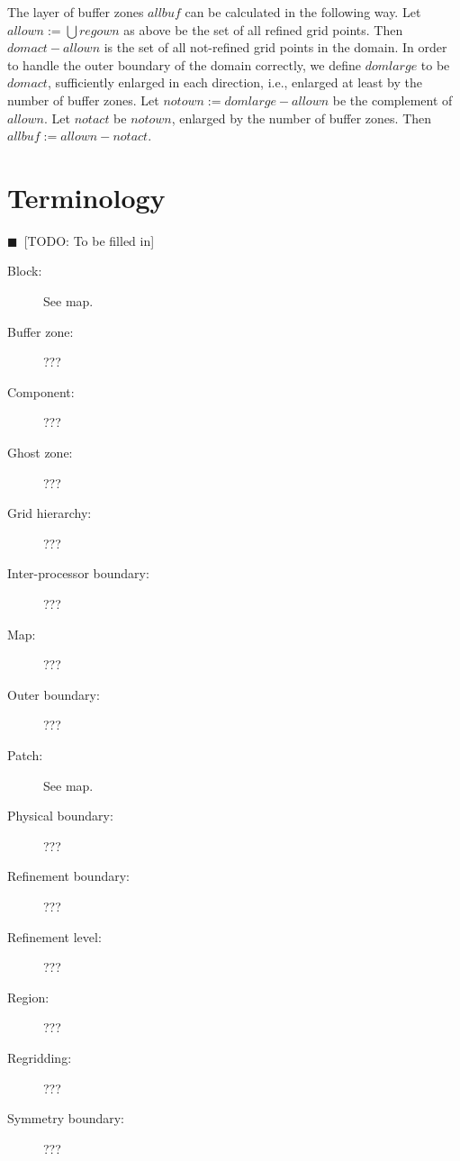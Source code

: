 \documentclass[nofootinbib, twocolumn]{revtex4}
\newcommand{\todo}[1]{{\color{blue}$\blacksquare$~\textsf{[TODO: #1]}}}
\begin{document}
The layer of buffer zones $allbuf$ can be calculated in the following
way.  Let $allown := \bigcup regown$ as above be the set of all
refined grid points.  Then $domact - allown$ is the set of all
not-refined grid points in the domain.  In order to handle the outer
boundary of the domain correctly, we define $domlarge$ to be $domact$,
sufficiently enlarged in each direction, i.e., enlarged at least by
the number of buffer zones.  Let $notown := domlarge - allown$ be the
complement of $allown$.  Let $notact$ be $notown$, enlarged by the
number of buffer zones.  Then $allbuf := allown - notact$.



\appendix
\section{Terminology}

\todo{To be filled in}
\begin{description}
\item[Block:] See map.
\item[Buffer zone:] ???
\item[Component:] ???
\item[Ghost zone:] ???
\item[Grid hierarchy:] ???
\item[Inter-processor boundary:] ???
\item[Map:] ???
\item[Outer boundary:] ???
\item[Patch:] See map.
\item[Physical boundary:] ???
\item[Refinement boundary:] ???
\item[Refinement level:] ???
\item[Region:] ???
\item[Regridding:] ???
\item[Symmetry boundary:] ???
\end{description}





\end{document}
